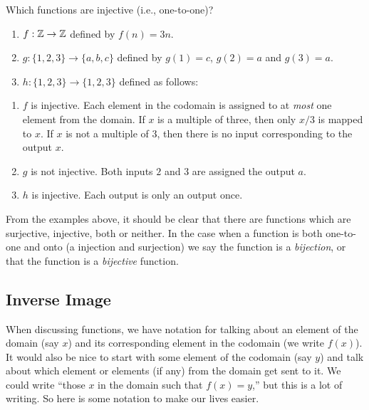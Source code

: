 \documentclass[12pt]{article}
\begin{document}
\begin{example}
  Which functions are injective (i.e., one-to-one)?
    \begin{enumerate}
    \item $f:\mathbb Z \to \mathbb Z$ defined by $f(n) = 3n$.
    \item $g: \{1,2,3\} \to \{a,b,c\}$ defined by $g(1) = c$, $g(2) = a$ and $g(3) = a$.
    \item $h:\{1,2,3\} \to \{1,2,3\}$ defined as follows:
    \begin{center}
    \end{center}
  \end{enumerate}
  \begin{solution}
    \begin{enumerate}
      \item $f$ is injective.  Each element in the codomain is assigned to at \emph{most} one element from the domain.  If $x$ is a multiple of three, then only $x/3$ is mapped to $x$.  If $x$ is not a multiple of 3, then there is no input corresponding to the output $x$.
      \item $g$ is not injective.  Both inputs $2$ and $3$ are assigned the output $a$.
      \item $h$ is injective.  Each output is only an output once.
    \end{enumerate}

  \end{solution}

\end{example}



From the examples above, it should be clear that there are functions which are surjective, injective, both or neither.  In the case when a function is both one-to-one and onto (a injection and surjection) we say the function is a \emph{bijection}, or that the function is a \emph{bijective} function.

\subsection{Inverse Image}

When discussing functions, we have notation for talking about an element of the domain (say $x$) and its corresponding element in the codomain (we write $f(x)$).  It would also be nice to start with some element of the codomain (say $y$) and talk about which element or elements (if any) from the domain get sent to it.  We could write ``those $x$ in the domain such that $f(x) = y$,'' but this is a lot of writing.  So here is some notation to make our lives easier.
\end{document}
